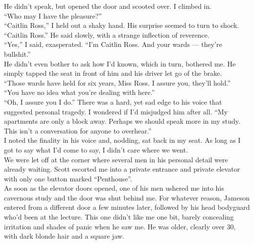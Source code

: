 \documentclass[a5paper]{scrartcl}
\begin{document}
He didn't speak, but opened the door and scooted over. I climbed in.\\


\enquote{Who may I have the pleasure?}\\


\enquote{Caitlin Ross,} I held out a shaky hand. His surprise seemed to turn to shock.\\


\enquote{Caitlin Ross.} He said slowly, with a strange inflection of reverence.\\


\enquote{Yes,} I said, exasperated. \enquote{I'm Caitlin Ross. And your wards --- they're bullshit.}\\


He didn't even bother to ask how I'd known, which in turn, bothered me. He simply tapped the seat in front of him and his driver let go of the brake.\\


\enquote{Those wards have held for six years, Miss Ross. I assure you, they'll hold.}\\


\enquote{You have no idea what you're dealing with here.}\\


\enquote{Oh, I assure you I do.} There was a hard, yet sad edge to his voice that suggested  personal tragedy. I wondered if I'd misjudged him after all. \enquote{My apartments are only a block away. Perhaps we should speak more in my study. This isn't a conversation for anyone to overhear.}\\


I noted the finality in his voice and, nodding, sat back in my seat. As long as I got to say what I'd come to say, I didn't care where we went. \\


We were let off at the corner where several men in his personal detail were already waiting. Scott escorted me into a private entrance and private elevator with only one button marked \enquote{Penthouse}.\\


As soon as the elevator doors opened, one of his men ushered me into his cavernous study and the door was shut behind me. For whatever reason, Jameson entered from a different door a few minutes later, followed by his head bodyguard who'd been at the lecture. This one didn't like me one bit, barely concealing irritation and shades of panic when he saw me. He was older, clearly over 30, with dark blonde hair and a square jaw.\\
\end{document}
